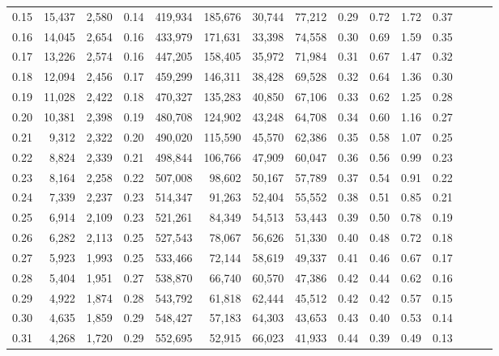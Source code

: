 \begin{tabular}{rrrrrrrrrrrrrrr}
0.15 &  15,437 &  2,580 &  0.14 &  419,934 &  185,676 &   30,744 &   77,212 &  0.29 &  0.72 &  1.72 &      0.37 \\
0.16 &  14,045 &  2,654 &  0.16 &  433,979 &  171,631 &   33,398 &   74,558 &  0.30 &  0.69 &  1.59 &      0.35 \\
0.17 &  13,226 &  2,574 &  0.16 &  447,205 &  158,405 &   35,972 &   71,984 &  0.31 &  0.67 &  1.47 &      0.32 \\
0.18 &  12,094 &  2,456 &  0.17 &  459,299 &  146,311 &   38,428 &   69,528 &  0.32 &  0.64 &  1.36 &      0.30 \\
0.19 &  11,028 &  2,422 &  0.18 &  470,327 &  135,283 &   40,850 &   67,106 &  0.33 &  0.62 &  1.25 &      0.28 \\
0.20 &  10,381 &  2,398 &  0.19 &  480,708 &  124,902 &   43,248 &   64,708 &  0.34 &  0.60 &  1.16 &      0.27 \\
0.21 &   9,312 &  2,322 &  0.20 &  490,020 &  115,590 &   45,570 &   62,386 &  0.35 &  0.58 &  1.07 &      0.25 \\
0.22 &   8,824 &  2,339 &  0.21 &  498,844 &  106,766 &   47,909 &   60,047 &  0.36 &  0.56 &  0.99 &      0.23 \\
0.23 &   8,164 &  2,258 &  0.22 &  507,008 &   98,602 &   50,167 &   57,789 &  0.37 &  0.54 &  0.91 &      0.22 \\
0.24 &   7,339 &  2,237 &  0.23 &  514,347 &   91,263 &   52,404 &   55,552 &  0.38 &  0.51 &  0.85 &      0.21 \\
0.25 &   6,914 &  2,109 &  0.23 &  521,261 &   84,349 &   54,513 &   53,443 &  0.39 &  0.50 &  0.78 &      0.19 \\
0.26 &   6,282 &  2,113 &  0.25 &  527,543 &   78,067 &   56,626 &   51,330 &  0.40 &  0.48 &  0.72 &      0.18 \\
0.27 &   5,923 &  1,993 &  0.25 &  533,466 &   72,144 &   58,619 &   49,337 &  0.41 &  0.46 &  0.67 &      0.17 \\
0.28 &   5,404 &  1,951 &  0.27 &  538,870 &   66,740 &   60,570 &   47,386 &  0.42 &  0.44 &  0.62 &      0.16 \\
0.29 &   4,922 &  1,874 &  0.28 &  543,792 &   61,818 &   62,444 &   45,512 &  0.42 &  0.42 &  0.57 &      0.15 \\
0.30 &   4,635 &  1,859 &  0.29 &  548,427 &   57,183 &   64,303 &   43,653 &  0.43 &  0.40 &  0.53 &      0.14 \\
0.31 &   4,268 &  1,720 &  0.29 &  552,695 &   52,915 &   66,023 &   41,933 &  0.44 &  0.39 &  0.49 &      0.13 \\

\end{tabular}
